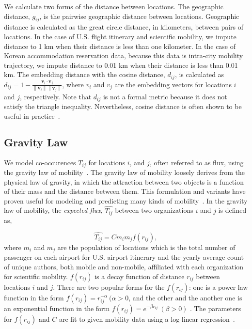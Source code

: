 \documentclass[12pt]{article} %
\begin{document}
We calculate two forms of the distance between locations.
The geographic distance, $g_{ij}$, is the pairwise geographic distance between locations.
Geographic distance is calculated as the great circle distance, in kilometers, between pairs of locations.
In the case of U.S. flight itinerary and scientific mobility, we impute distance to 1 km when their distance is less than one kilometer. In the case of Korean accommodation reservation data, because this data is intra-city mobility trajectory, we impute distance to 0.01 km when their distance is less than 0.01 km. The embedding distance with the cosine distance, $d_{ij}$, is calculated as $d_{ij} = 1 - \frac{\bm{v}_{i} \cdot \bm{v}_{j}}{\lVert \bm{v}_{i} \rVert \lVert \bm{v}_{j} \rVert}$,
where $v_i$ and $v_j$ are the embedding vectors for locations $i$ and $j$, respectively.
Note that $d_{ij}$ is not a formal metric because it does not satisfy the triangle inequality.
Nevertheless, cosine distance is often shown to be useful in practice~\autocite{lerman2007embedding, brown1970migration, brown1970functional, kim2018functional}. 



%
%
\subsection*{Gravity Law}

We model co-occurences $T_{ij}$ for locations $i$, and $j$, often referred to as flux, using the gravity law of mobility~\autocite{zipf1946gravity}.
The gravity law of mobility loosely derives from the physical law of gravity, in which the attraction between two objects is a function of their mass and the distance between them.
This formulation and variants have proven useful for modeling and predicting many kinds of mobility~\autocite{jung2008highwaygravity, curiel2018citygravity, lewer2008immigrationgravity, xia2005measlesgravity, truscott2012epidemicgravity, hong2016busgravity}.
In the gravity law of mobility, the \textit{expected flux}, $\hat{T_{ij}}$ between two organizations $i$ and $j$ is defined as,

%
%
\begin{equation}
	\label{eq:gravity_basic}
	\hat{T_{ij}} = Cm_{i}m_{j}f(r_{ij}),
\end{equation}
where $m_{i}$ and $m_{j}$ are the population of locations which is the total number of passenger on each airport for U.S. airport itinerary and the yearly-average count of unique authors, both mobile and non-mobile, affiliated with each organization for scientific mobility.  $f(r_{ij})$ is a decay function of distance $r_{ij}$ between locations $i$ and $j$. 
There are two popular forms for the $f(r_{ij})$:
one is a power law function in the form $f(r_{ij})= r^{-\alpha}_{ij} \ (\alpha > 0$, and the other and the another one is an exponential function in the form $f(r_{ij}) = e^{-\beta r_{ij}} \ (\beta > 0)$ \autocite{chen2015distance}.  
The parameters for $f(r_{ij})$ and $C$ are fit to given mobility data using a log-linear regression~\autocite{jung2008highwaygravity, curiel2018citygravity, lewer2008immigrationgravity, xia2005measlesgravity, truscott2012epidemicgravity, hong2016busgravity, simini2012universal}.
\end{document}
